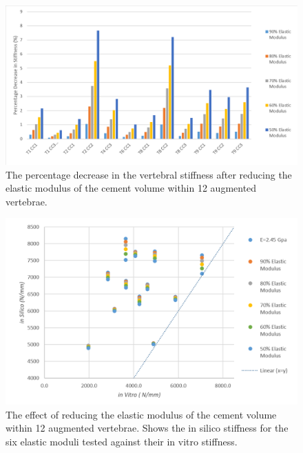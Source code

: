 \begin{figure}[ht!]
\centering
\includegraphics[width=\textwidth]{images/reductionOfEMod_Bar.png}
\caption{The percentage decrease in the vertebral stiffness after reducing the elastic modulus of the cement volume within 12 augmented vertebrae.}
\label{fig:redEModBar}
\end{figure}

\begin{figure}[ht!]
\centering
\includegraphics[width=5.3in]{images/reductionOfEMod_Scatter.png}
\caption{The effect of reducing the elastic modulus of the cement volume within 12 augmented vertebrae. Shows the in silico stiffness for the six elastic moduli tested against their in vitro stiffness. }
\label{fig:redEModscatter}
\end{figure}


